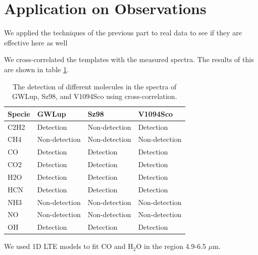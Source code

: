 \documentclass[oneside, single, authoryear, semicolon]{lion-msc}
\newcommand{\4}{$_4$}
\newcommand{\3}{$_3$}
\newcommand{\2}{$_2$}
\begin{document}
\section{Application on Observations}
We applied the techniques of the previous part to real data to see if they are effective here as well

We cross-correlated the templates with the measured spectra. The results of this are shown in table \ref{tab: realdata}.

\begin{table}[!ht]
\centering
\begin{tabular}{llll}
\hline
\textbf{Specie} & \textbf{GWLup} & \textbf{Sz98} & \textbf{V1094Sco} \\ \hline
C2H2            & Detection      & Non-detection & Detection         \\
CH4             & Non-detection  & Non-detection & Non-detection     \\
CO              & Detection      & Detection     & Detection         \\
CO2             & Detection      & Detection     & Detection         \\
H2O             & Detection      & Detection     & Detection         \\
HCN             & Detection      & Detection     & Detection         \\
NH3             & Non-detection  & Non-detection & Non-detection     \\
NO              & Non-detection  & Non-detection & Non-detection     \\
OH              & Detection      & Detection     & Detection         \\ \hline
\end{tabular}
\caption{The detection of different molecules in the spectra of GWLup, Sz98, and V1094Sco using cross-correlation.}
\label{tab: realdata}
\end{table}


We used 1D LTE models to fit CO and H\2O in the region 4.9-6.5 $\mu$m.
\end{document}
